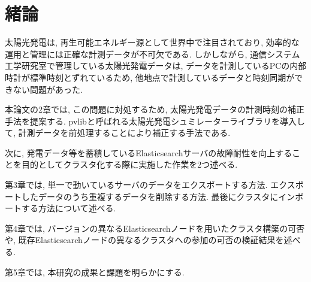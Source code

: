 \chapter{緒論}
\label{chap:first}

太陽光発電は, 再生可能エネルギー源として世界中で注目されており, 効率的な運用と管理には正確な計測データが不可欠である. しかしながら, 通信システム工学研究室で管理している太陽光発電データは, データを計測しているPCの内部時計が標準時刻とずれているため, 他地点で計測しているデータと時刻同期ができない問題があった.

本論文の2章では, この問題に対処するため, 太陽光発電データの計測時刻の補正手法を提案する. pvlibと呼ばれる太陽光発電シュミレーターライブラリを導入して, 計測データを前処理することにより補正する手法である.

次に, 発電データ等を蓄積しているElasticsearchサーバの故障耐性を向上することを目的としてクラスタ化する際に実施した作業を2つ述べる.

第3章では, 単一で動いているサーバのデータをエクスポートする方法. エクスポートしたデータのうち重複するデータを削除する方法. 最後にクラスタにインポートする方法について述べる.

第4章では, バージョンの異なるElasticsearchノードを用いたクラスタ構築の可否や, 既存Elasticsearchノードの異なるクラスタへの参加の可否の検証結果を述べる. 

第5章では, 本研究の成果と課題を明らかにする.